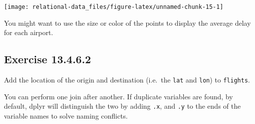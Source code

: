 \documentclass[]{book}
\newenvironment{Shaded}{\begin{snugshade}}{\end{snugshade}}
\newcommand{\CommentTok}[1]{\textcolor[rgb]{0.56,0.35,0.01}{\textit{#1}}}
\newcommand{\DataTypeTok}[1]{\textcolor[rgb]{0.13,0.29,0.53}{#1}}
\newcommand{\KeywordTok}[1]{\textcolor[rgb]{0.13,0.29,0.53}{\textbf{#1}}}
\newcommand{\NormalTok}[1]{#1}
\newcommand{\OperatorTok}[1]{\textcolor[rgb]{0.81,0.36,0.00}{\textbf{#1}}}
\newcommand{\OtherTok}[1]{\textcolor[rgb]{0.56,0.35,0.01}{#1}}
\newcommand{\StringTok}[1]{\textcolor[rgb]{0.31,0.60,0.02}{#1}}
\theoremstyle{plain}
\theoremstyle{remark}
\begin{document}
\begin{Shaded}
\end{Shaded}

\begin{center}\texttt{[image: relational-data\_files/figure-latex/unnamed-chunk-15-1]} \end{center}

You might want to use the size or color of the points to display the
average delay for each airport.

\hypertarget{exercise-13.4.6.2}{%
\subsection*{\texorpdfstring{Exercise
{13.4.6.2}}{Exercise 13.4.6.2}}\label{exercise-13.4.6.2}}

Add the location of the origin and destination (i.e.~the \texttt{lat}
and \texttt{lon}) to \texttt{flights}.

You can perform one join after another. If duplicate variables are
found, by default, dplyr will distinguish the two by adding \texttt{.x},
and \texttt{.y} to the ends of the variable names to solve naming
conflicts.
\end{document}
